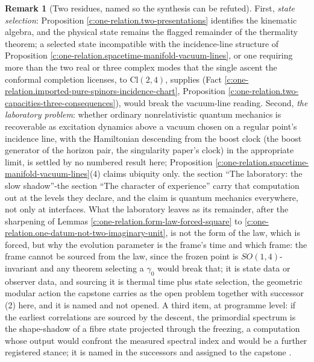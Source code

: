 \documentclass[11pt]{article}
\theoremstyle{definition}
\newtheorem{remark}[theorem]{Remark}
\theoremstyle{plain}
\providecommand{\Cl}{}\renewcommand{\Cl}{\mathrm{Cl}}
\begin{document}
\begin{remark}[Two residues, named so the synthesis can be refuted]\label{c:note.one-relation.two-residues-named-so-synthesis-can}
First, \emph{state selection}: Proposition \ref{c:one-relation.two-presentations} identifies the kinematic algebra, and the physical state remains the flagged remainder of the thermality theorem; a selected state incompatible with the incidence-line structure of Proposition \ref{c:one-relation.spacetime-manifold-vacuum-lines}, or one requiring more than the two real or three complex modes that the single ascent the conformal completion licenses, to $\Cl(2,4)$, supplies (Fact \ref{c:one-relation.imported-pure-spinors-incidence-chart}, Proposition \ref{c:one-relation.two-capacities-three-consequences}), would break the vacuum-line reading. Second, \emph{the laboratory problem}: whether ordinary nonrelativistic quantum mechanics is recoverable as excitation dynamics above a vacuum chosen on a regular point's incidence line, with the Hamiltonian descending from the boost clock (the boost generator of the horizon pair, the singularity paper's clock) in the appropriate limit, is settled by no numbered result here; Proposition \ref{c:one-relation.spacetime-manifold-vacuum-lines}(4) claims ubiquity only. the section ``The laboratory: the slow shadow''-the section ``The character of experience'' carry that computation out at the levels they declare, and the claim is quantum mechanics everywhere, not only at interfaces. What the laboratory leaves as its remainder, after the sharpening of Lemmas \ref{c:one-relation.form-law-forced-square} to \ref{c:one-relation.one-datum-not-two-imaginary-unit}, is not the form of the law, which is forced, but why the evolution parameter is the frame's time and which frame: the frame cannot be sourced from the law, since the frozen point is $SO(1,4)$-invariant and any theorem selecting a $\gamma_{0}$ would break that; it is state data or observer data, and sourcing it is thermal time plus state selection, the geometric modular action the capstone carries as the open problem together with successor (2) here, and it is named and not opened. A third item, at programme level: if the earliest correlations are sourced by the descent, the primordial spectrum is the shape-shadow of a fibre state projected through the freezing, a computation whose output would confront the measured spectral index and would be a further registered stance; it is named in the successors and assigned to the capstone \cite{ButlerT17}.
\end{remark}
\end{document}
